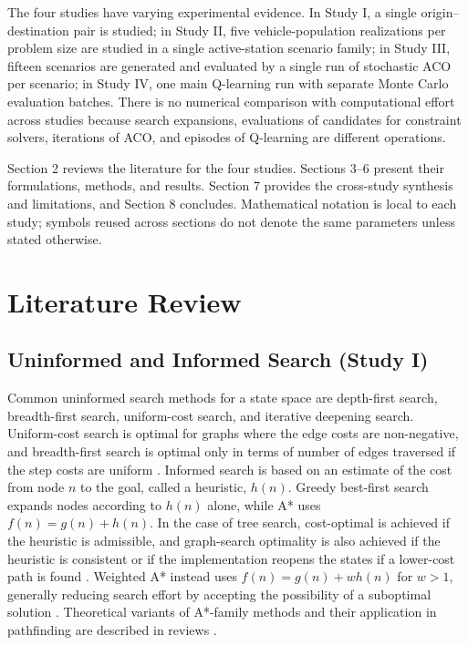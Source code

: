 \documentclass{ai-lab-report}
\begin{document}
The four studies have varying experimental evidence. In Study I, a single origin--destination pair is studied; in Study II, five vehicle-population realizations per problem size are studied in a single active-station scenario family; in Study III, fifteen scenarios are generated and evaluated by a single run of stochastic ACO per scenario; in Study IV, one main Q-learning run with separate Monte Carlo evaluation batches. There is no numerical comparison with computational effort across studies because search expansions, evaluations of candidates for constraint solvers, iterations of ACO, and episodes of Q-learning are different operations.

Section 2 reviews the literature for the four studies. Sections 3--6 present their formulations, methods, and results. Section 7 provides the cross-study synthesis and limitations, and Section 8 concludes. Mathematical notation is local to each study; symbols reused across sections do not denote the same parameters unless stated otherwise.

\section{Literature Review}

\subsection{Uninformed and Informed Search (Study I)}

Common uninformed search methods for a state space are depth-first search, breadth-first search, uniform-cost search, and iterative deepening search. Uniform-cost search is optimal for graphs where the edge costs are non-negative, and breadth-first search is optimal only in terms of number of edges traversed if the step costs are uniform \citep{russell2021ai}. Informed search is based on an estimate of the cost from node $n$ to the goal, called a heuristic, $h(n)$. Greedy best-first search expands nodes according to $h(n)$ alone, while A* uses
$f(n)=g(n)+h(n)$. In the case of tree search, cost-optimal is achieved if the heuristic is admissible, and graph-search optimality is also achieved if the heuristic is consistent or if the implementation reopens the states if a lower-cost path is found \citep{hart1968formal}. Weighted A* instead uses
$f(n)=g(n)+w h(n)$ for $w>1$, generally reducing search effort by accepting the possibility of a suboptimal solution \citep{pohl1970heuristic,russell2021ai}. Theoretical variants of A*-family methods and their application in pathfinding are described in reviews \citep{foead2021systematic}.
\end{document}
